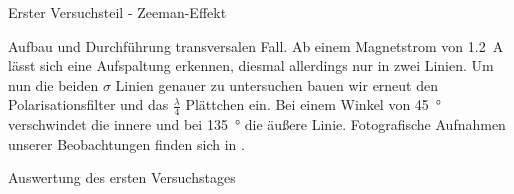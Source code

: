 \documentclass[pdftex, a4paper,11pt, twoside, ngerman]{report}
\begin{document}
\begin{chapter}{Erster Versuchsteil - Zeeman-Effekt}
\begin{section}{Aufbau und Durchführung}
      transversalen Fall. Ab einem Magnetstrom von \SI{1,2}{\ampere} lässt sich
      eine Aufspaltung erkennen, diesmal allerdings nur in zwei Linien. Um nun
      die beiden $\sigma$ Linien genauer zu untersuchen bauen wir erneut den
      Polarisationsfilter und das $\frac \lambda 4$ Plättchen ein. Bei einem
      Winkel von \SI{45}{\degree} verschwindet die innere und bei
      \SI{135}{\degree} die äußere Linie. Fotografische Aufnahmen unserer
      Beobachtungen finden sich in .
    \end{section}
    
    
    
    \begin{section}{Auswertung des ersten Versuchstages}
      \label{chp:Zeeman:sec:Auswertung}
      
      
      

\end{section}
\end{chapter}
\end{document}
